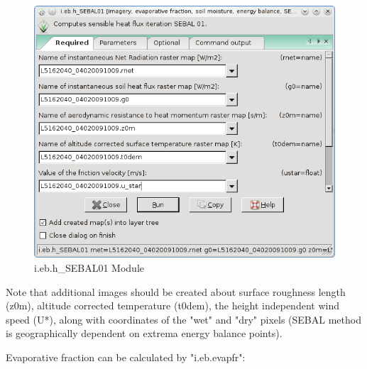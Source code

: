 \begin{figure}[htbp]
   \centering
   \includegraphics[scale=0.4]{gipe027.png}
   \caption{i.eb.h\_SEBAL01 Module}
   \label{fig:gipe027}
\end{figure}

Note that additional images should be created about surface roughness length (z0m), altitude corrected temperature (t0dem), the height independent wind speed (U*), along with coordinates of the "wet" and "dry" pixels (SEBAL method is geographically dependent on extrema energy balance points). \newline

Evaporative fraction can be calculated by "i.eb.evapfr":\newline


